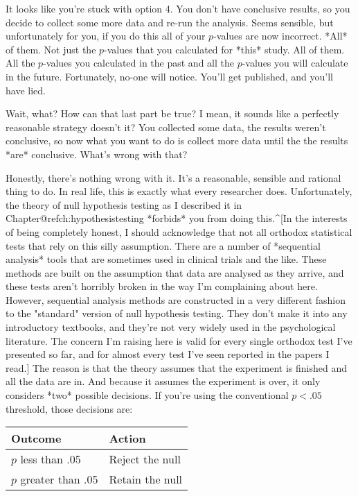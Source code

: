 \item It looks like you're stuck with option 4. You don't have conclusive results, so you decide to collect some more data and re-run the analysis. Seems sensible, but unfortunately for you, if you do this all of your $p$-values are now incorrect. *All* of them. Not just the $p$-values that you calculated for *this* study. All of them. All the $p$-values you calculated in the past and all the $p$-values you will calculate in the future. Fortunately, no-one will notice. You'll get published, and you'll have lied.




Wait, what? How can that last part be true? I mean, it sounds like a perfectly reasonable strategy doesn't it? You collected some data, the results weren't conclusive, so now what you want to do is collect more data until the the results *are* conclusive. What's wrong with that?

Honestly, there's nothing wrong with it. It's a reasonable, sensible and rational thing to do. In real life, this is exactly what every researcher does. Unfortunately, the theory of null hypothesis testing as I described it in Chapter@refch:hypothesistesting *forbids* you from doing this.^[In the interests of being completely honest,  I should acknowledge that not all orthodox statistical tests that rely on this silly assumption. There are a number of *sequential analysis* tools that are sometimes used in clinical trials and the like. These methods are built on the assumption that data are analysed as they arrive, and these tests aren't horribly broken in the way I'm complaining about here. However, sequential analysis methods are constructed in a very different fashion to the "standard" version of null hypothesis testing. They don't make it into any introductory textbooks, and they're not very widely used in the psychological literature. The concern I'm raising here is valid for every single orthodox test I've presented so far, and for almost every test I've seen reported in the papers I read.] The reason is that the theory assumes that the experiment is finished and all the data are in. And because it assumes the experiment is over, it only considers *two* possible decisions. If you're using the conventional $p<.05$ threshold, those decisions are:

\begin{center}
\begin{tabular}{l|l}
Outcome & Action \\ \hline
$p$ less than .05 & Reject the null \\
$p$ greater than .05 & Retain the null
\end{tabular}
\end{center}


